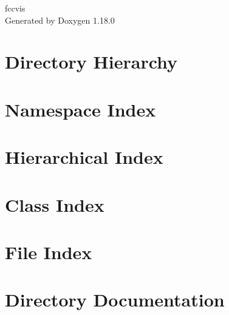 \documentclass[twoside]{book}
\newcommand{\+}{\discretionary{\mbox{\scriptsize$\hookleftarrow$}}{}{}}
\newcommand{\clearemptydoublepage}{%
    \newpage{\pagestyle{empty}\cleardoublepage}%
  }
\begin{document}
  \raggedbottom
    \hypersetup{pageanchor=false,
                bookmarksnumbered=true,
                pdfencoding=unicode
               }
  \begin{titlepage}
  \vspace*{7cm}
  \begin{center}%
  {\Large fccvis}\\
  \vspace*{1cm}
  {\large Generated by Doxygen 1.18.0}\\
  \end{center}
  \end{titlepage}
  \clearemptydoublepage
  \tableofcontents
  \clearemptydoublepage
  \hypersetup{pageanchor=true}
\chapter{Directory Hierarchy}

\chapter{Namespace Index}

\chapter{Hierarchical Index}

\chapter{Class Index}

\chapter{File Index}

\chapter{Directory Documentation}

















\end{document}
